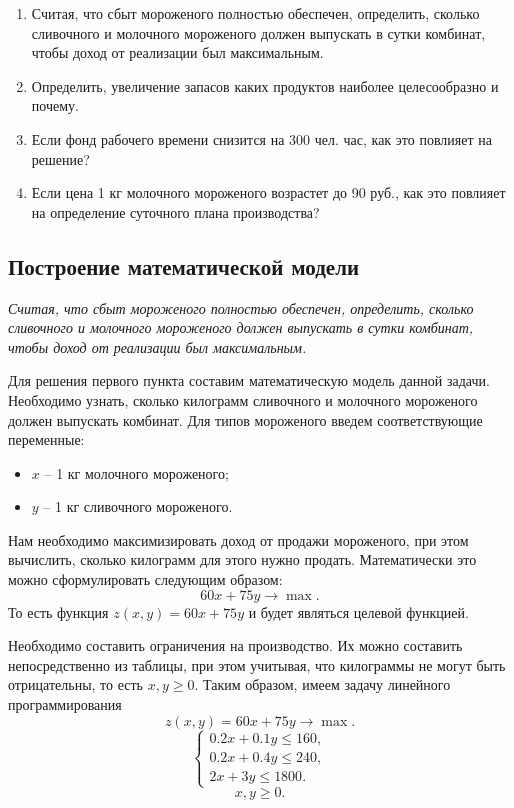 \documentclass[11pt]{article}
\begin{document}
\begin{enumerate}
\def\labelenumi{\arabic{enumi}.}
\item
  Считая, что сбыт мороженого полностью обеспечен, определить, сколько
  сливочного и молочного мороженого должен выпускать в сутки комбинат,
  чтобы доход от реализации был максимальным.
\item
  Определить, увеличение запасов каких продуктов наиболее целесообразно
  и почему.
\item
  Если фонд рабочего времени снизится на 300 чел. час, как это повлияет
  на решение?
\item
  Если цена 1 кг молочного мороженого возрастет до 90 руб., как это
  повлияет на определение суточного плана производства?
\end{enumerate}

    \subsection{Построение математической
модели}\label{ux43fux43eux441ux442ux440ux43eux435ux43dux438ux435-ux43cux430ux442ux435ux43cux430ux442ux438ux447ux435ux441ux43aux43eux439-ux43cux43eux434ux435ux43bux438}

    \emph{Считая, что сбыт мороженого полностью обеспечен, определить,
сколько сливочного и молочного мороженого должен выпускать в сутки
комбинат, чтобы доход от реализации был максимальным.}

Для решения первого пункта составим математическую модель данной задачи.
Необходимо узнать, сколько килограмм сливочного и молочного мороженого
должен выпускать комбинат. Для типов мороженого введем соответствующие
переменные:

\begin{itemize}
\item
  \(x\) -- 1 кг молочного мороженого;
\item
  \(y\) -- 1 кг сливочного мороженого.
\end{itemize}

Нам необходимо максимизировать доход от продажи мороженого, при этом
вычислить, сколько килограмм для этого нужно продать. Математически это
можно сформулировать следующим образом: \[60x + 75y \to \max.\] То есть
функция \(z(x,y) = 60x+ 75y\) и будет являться целевой функцией.

Необходимо составить ограничения на производство. Их можно составить
непосредственно из таблицы, при этом учитывая, что килограммы не могут
быть отрицательны, то есть \(x, y\geq 0\). Таким образом, имеем задачу
линейного программирования \[z(x,y) = 60x + 75y \to \max.\]
\[\begin{cases}
0.2x + 0.1 y \leq 160,\\
0.2x + 0.4 y \leq 240,\\
2x+3y \leq 1800.
\end{cases}\] \[x,y \geq 0.\]
\end{document}

